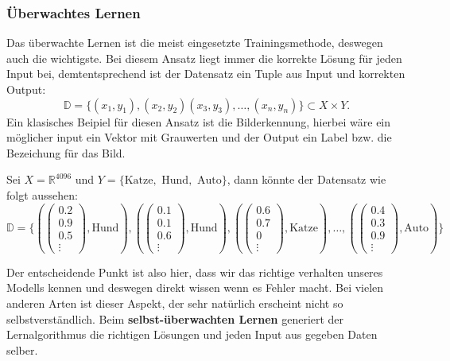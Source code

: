 \documentclass[12pt,letterpaper,ngerman]{article}
\begin{document}
\subsubsection{Überwachtes Lernen}
Das überwachte Lernen ist die meist eingesetzte Trainingsmethode, deswegen
auch die wichtigste. Bei diesem Ansatz liegt immer die korrekte Lösung
für jeden Input bei, demtentsprechend ist der Datensatz ein Tuple aus Input und
korrekten Output: 
  \[\mathbb{D} = \{ (x_1,y_1), (x_2,y_2) (x_3,y_3), \dots ,(x_n,y_n)\} 
  \subset X \times Y.\]
Ein klasisches Beipiel für diesen Ansatz ist die Bilderkennung, hierbei 
wäre ein möglicher input ein Vektor mit Grauwerten und der Output ein 
Label bzw. die Bezeichung für das Bild.
\begin{example}
  Sei $X = \mathbb{R}^{4096}$ und
   $Y = \{ \text{Katze}, \text{ Hund}, \text{ Auto}\}$, dann könnte der 
   Datensatz wie folgt aussehen:
   \[
     \mathbb{D} = \{
     (\begin{pmatrix} 0.2 \\ 0.9 \\ 0.5 \\ \vdots \end{pmatrix}, \text{Hund}),
     (\begin{pmatrix} 0.1 \\ 0.1 \\ 0.6 \\ \vdots \end{pmatrix}, \text{Hund}),
     (\begin{pmatrix} 0.6 \\ 0.7 \\ 0 \\ \vdots \end{pmatrix}, \text{Katze}),
     \dots, 
     (\begin{pmatrix} 0.4 \\ 0.3 \\ 0.9 \\ \vdots \end{pmatrix}, \text{Auto})
    \}
   \]
\end{example}
Der entscheidende Punkt ist also hier, dass wir das richtige verhalten
unseres Modells kennen und deswegen direkt wissen wenn es Fehler macht.
Bei vielen anderen Arten ist dieser Aspekt, der sehr natürlich 
erscheint nicht so selbstverständlich. Beim {\bf selbst-überwachten Lernen}
generiert der Lernalgorithmus die richtigen Lösungen und jeden Input
aus gegeben Daten selber.
\end{document}
